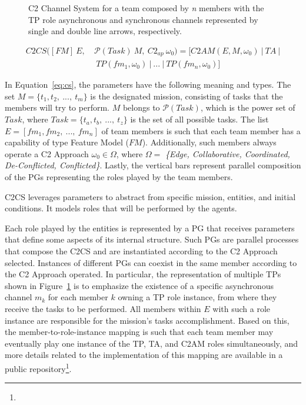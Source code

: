 \begin{figure}[ht]
    \centering
    \scalebox{.8}{}
    \caption{C2 Channel System for a team composed by \textit{n} members with the TP role asynchronous and synchronous channels represented by single and double line arrows, respectively.}
    \label{fig:cs}
\end{figure}


\begin{equation}
    \label{eq:cs}
    \begin{split}
    C2CS([FM]\ E,\ &  \mathcal{P}(Task)\ M,\ C2_{ap}\ \omega_0) = [C2AM(E, M,\omega_0)\ |\ TA\ | \\ & \ TP(fm_1, \omega_0)\ |\ ...\ |\ TP(fm_n, \omega_0)]
    \end{split}
\end{equation}

\color{black}
In Equation~\ref{eq:cs}, the parameters have the following meaning and types. The set $M=\{t_1, t_2,\ ...,\ t_m \}$ is the designated mission, consisting of tasks that the members will try to perform. $M$ belongs to $\mathcal{P}(Task)$, which is the power set of $Task$, where $Task=\{t_a, t_b,\ ...,\ t_z \}$ is the set of all possible tasks. The list $E = [fm_1, fm_2,\ ...,\ fm_n ]$ of team members is such that each team member has a capability of type Feature Model ($FM$). Additionally, such members always operate a C2 Approach $\omega_0 \in \Omega$, where $\Omega =$ \textit{\{Edge, Collaborative, Coordinated, De-Conflicted, Conflicted\}}. Lastly, the vertical bars represent parallel composition of the PGs representing the roles played by the team members.
\color{black}

C2CS leverages parameters to abstract from specific mission, entities, and initial conditions. It models roles that will be performed by the agents.

Each role played by the entities is represented by a PG that receives parameters that define some aspects of its internal structure. Such PGs are parallel processes that compose the C2CS and are instantiated according to the C2 Approach selected. Instances of different PGs can coexist in the same member according to the C2 Approach operated. In particular, the representation of multiple TPs shown in Figure~\ref{fig:cs} is to emphasize the existence of a specific asynchronous channel $m_k$ for each member $k$ owning a TP role instance, from where they receive the tasks to be performed. All members within $E$ with such a role instance are responsible for the mission's tasks accomplishment. Based on this, the member-to-role-instance mapping is such that each team member may eventually play one instance of the TP, TA, and C2AM roles simultaneously, and more details related to the implementation of this mapping are available in a public repository\footnote{\gitRepository}.
   
